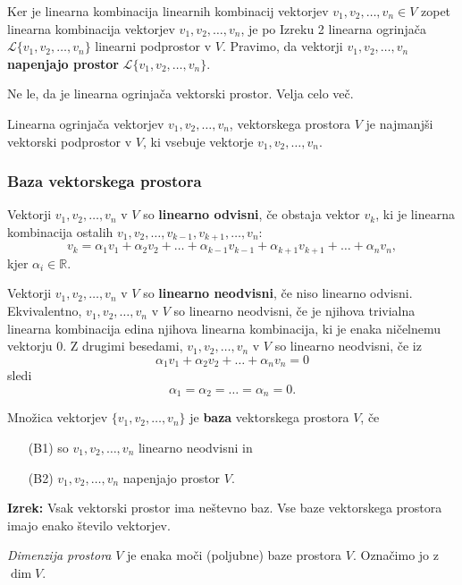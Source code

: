 \documentclass{article}
\begin{document}
\begin{multicols}{2}
	Ker je linearna kombinacija linearnih kombinacij vektorjev \( v_1, v_2, \ldots, v_n \in V \) zopet linearna kombinacija vektorjev \( v_1, v_2, \ldots, v_n \), je po Izreku 2 linearna ogrinjača \( \mathcal{L}\{v_1, v_2, \ldots, v_n\} \) linearni podprostor v \( V \). Pravimo, da vektorji \( v_1, v_2, \ldots, v_n \) \textbf{napenjajo prostor} \( \mathcal{L}\{v_1, v_2, \ldots, v_n\} \).

	Ne le, da je linearna ogrinjača vektorski prostor. Velja celo več.

	Linearna ogrinjača vektorjev \( v_1, v_2, \ldots, v_n \), vektorskega prostora \( V \) je najmanjši vektorski podprostor v \( V \), ki vsebuje vektorje \( v_1, v_2, \ldots, v_n \).

	\subsubsection{Baza vektorskega prostora}

	Vektorji \( v_1, v_2, \ldots, v_n \) v \( V \) so \textbf{linearno odvisni}, če obstaja vektor \( v_k \), ki je linearna kombinacija ostalih \( v_1, v_2, \ldots, v_{k-1}, v_{k+1}, \ldots, v_n \):
	\[ v_k = \alpha_1v_1 + \alpha_2v_2 + \ldots + \alpha_{k-1}v_{k-1} + \alpha_{k+1}v_{k+1} + \ldots + \alpha_nv_n, \]
	kjer \( \alpha_i \in \mathbb{R} \).

	Vektorji \( v_1, v_2, \ldots, v_n \) v \( V \) so \textbf{linearno neodvisni}, če niso linearno odvisni. Ekvivalentno, \( v_1, v_2, \ldots, v_n \) v \( V \) so linearno neodvisni, če je njihova trivialna linearna kombinacija edina njihova linearna kombinacija, ki je enaka ničelnemu vektorju \( 0 \). Z drugimi besedami, \( v_1, v_2, \ldots, v_n \) v \( V \) so linearno neodvisni, če iz
	\[ \alpha_1v_1 + \alpha_2v_2 + \ldots + \alpha_nv_n = 0 \]
	sledi
	\[ \alpha_1 = \alpha_2 = \ldots = \alpha_n = 0. \]


	Množica vektorjev \( \{v_1, v_2, \ldots, v_n\} \) je \textbf{baza} vektorskega prostora \( V \), če
	\begin{enumerate}
		\item[(B1)] so \( v_1, v_2, \ldots, v_n \) linearno neodvisni in
		\item[(B2)] \( v_1, v_2, \ldots, v_n \) napenjajo prostor \( V \).
	\end{enumerate}

	\textbf{Izrek:} Vsak vektorski prostor ima neštevno baz. Vse baze vektorskega prostora imajo enako število vektorjev.

	\emph{Dimenzija prostora} \( V \) je enaka moči (poljubne) baze prostora \( V \). Označimo jo z \(\dim V\).


\end{multicols}
\end{document}
